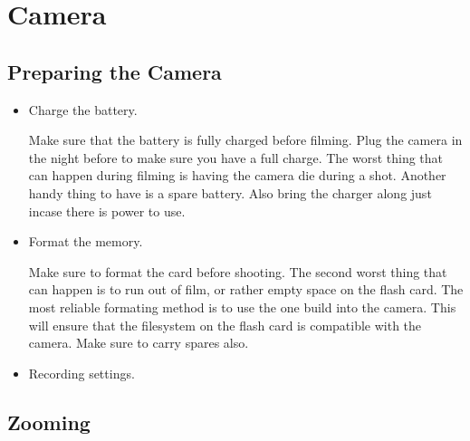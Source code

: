 \documentclass[letterpaper]{latexclasses/tmarticle}
\begin{document}
\maketitle

\newpage
\tableofcontents

\newpage

\section{Camera}

\subsection{Preparing the Camera}

\begin{itemize}
    \item
    Charge the battery.
    
    Make sure that the battery is fully charged before filming.  Plug the camera
    in the night before to make sure you have a full charge.  The worst thing
    that can happen during filming is having the camera die during a shot.
    Another handy thing to have is a spare battery.  Also bring the charger
    along just incase there is power to use.

    \item
    Format the memory.
    
    Make sure to format the card before shooting.  The second worst thing that
    can happen is to run out of film, or rather empty space on the flash card.
    The most reliable formating method is to use the one build into the camera.
    This will ensure that the filesystem on the flash card is compatible with
    the camera.  Make sure to carry spares also.

    \item
    Recording settings.
    

\end{itemize}

\subsection{Zooming}
\end{document}
